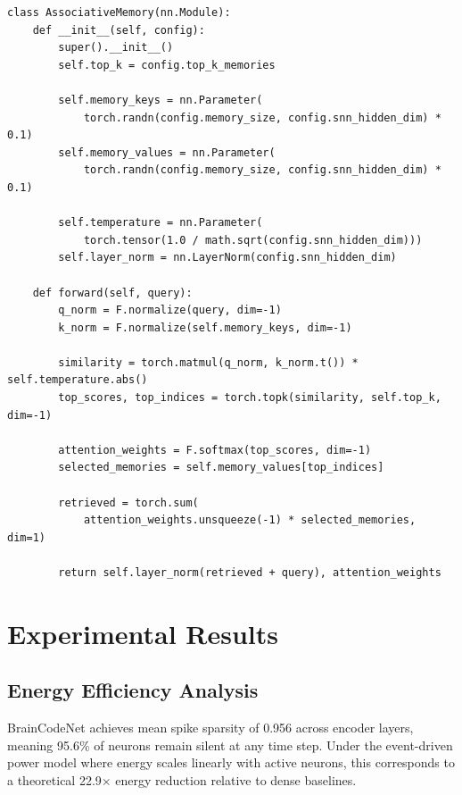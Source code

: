 \documentclass[11pt,a4paper]{article}
\begin{document}
\begin{lstlisting}[caption={Associative Memory Module}]
class AssociativeMemory(nn.Module):
    def __init__(self, config):
        super().__init__()
        self.top_k = config.top_k_memories
        
        self.memory_keys = nn.Parameter(
            torch.randn(config.memory_size, config.snn_hidden_dim) * 0.1)
        self.memory_values = nn.Parameter(
            torch.randn(config.memory_size, config.snn_hidden_dim) * 0.1)
        
        self.temperature = nn.Parameter(
            torch.tensor(1.0 / math.sqrt(config.snn_hidden_dim)))
        self.layer_norm = nn.LayerNorm(config.snn_hidden_dim)
    
    def forward(self, query):
        q_norm = F.normalize(query, dim=-1)
        k_norm = F.normalize(self.memory_keys, dim=-1)
        
        similarity = torch.matmul(q_norm, k_norm.t()) * self.temperature.abs()
        top_scores, top_indices = torch.topk(similarity, self.top_k, dim=-1)
        
        attention_weights = F.softmax(top_scores, dim=-1)
        selected_memories = self.memory_values[top_indices]
        
        retrieved = torch.sum(
            attention_weights.unsqueeze(-1) * selected_memories, dim=1)
        
        return self.layer_norm(retrieved + query), attention_weights
\end{lstlisting}

\section{Experimental Results}

\subsection{Energy Efficiency Analysis}

BrainCodeNet achieves mean spike sparsity of 0.956 across encoder layers, meaning 95.6\% of neurons remain silent at any time step. Under the event-driven power model where energy scales linearly with active neurons, this corresponds to a theoretical 22.9× energy reduction relative to dense baselines.
\end{document}
